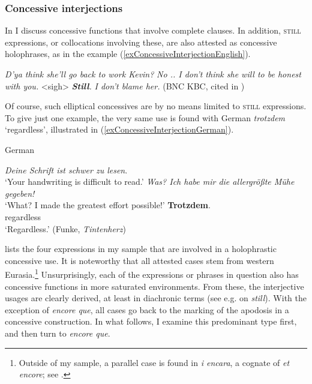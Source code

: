 \subsubsection{Concessive interjections} 
\label{sectionConcessiveInterjections}
 In  I discuss concessive functions that involve complete clauses. In addition, \textsc{still} expressions, or collocations involving these, are also attested as concessive holophrases, as in the  example (\ref{exConcessiveInterjectionEnglish}).

\begin{exe}
	\ex {}\label{exConcessiveInterjectionEnglish}
	\begin{xlist}
		 \textit{D'ya think she'll go back to work Kevin?}
		 \textit{No .. I don't think she will to be honest with you.}
		 <sigh>
		 \textit{\textbf{Still}.}
		 \textit{I don't blame her.} (BNC KBC, cited in \cite[129]{Lewis2019})
	\end{xlist}
\end{exe}

Of course, such elliptical concessives are by no means limited to \textsc{still} expressions. To give just one example, the very same use is found with German \textit{trotzdem} \lq regardless\rq{}, illustrated in (\ref{exConcessiveInterjectionGerman}).

\begin{exe}
	\ex German\label{exConcessiveInterjectionGerman}
	\begin{xlist}
	\textit{ Deine Schrift ist schwer zu lesen}.\\
		\lq Your handwriting is difficult to read.\rq
		 \textit{Was? Ich habe mir die allergrößte Mühe gegeben!}\\
		\lq What? I made the greatest effort possible!\rq{}		
		 \gll \textbf{Trotzdem}.\\
		regardless\\
		\glt \lq Regardless.\rq{ }(Funke, \textit{Tintenherz})
	\end{xlist}
\end{exe}

 lists the four expressions in my sample that are involved in a holophrastic concessive use. It is noteworthy that all attested cases stem from western Eurasia.\footnote{Outside of my sample, a parallel case is found in  \textit{i encara}, a cognate of  \textit{et encore}; see \textcite{PerezSaldanyaSalvador1995}.} Unsurprisingly, each of the expressions or phrases in question also has concessive functions in more saturated environments. From these, the interjective usages are clearly derived, at least in diachronic terms (see e.g. \cite{Lewis2019} on  \textit{still}). With the exception of  \textit{encore que}, all cases go back to the marking of the apodosis in a concessive construction. In what follows, I examine this predominant type first, and then turn to \textit{encore que}.

